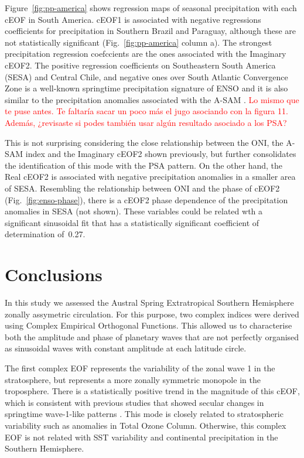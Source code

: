 \documentclass[smallextended]{svjour3}       %
\begin{document}
Figure~\ref{fig:pp-america} shows regression maps of seasonal precipitation with each cEOF in South America. cEOF1 is associated with negative regressions coefficients for precipitation in Southern Brazil and Paraguay, although these are not statistically significant (Fig.~\ref{fig:pp-america} column a). The strongest precipitation regression coefccients are the ones associated with the Imaginary cEOF2. The positive regression coefficients on Southeastern South America (SESA) and Central Chile, and negative ones over South Atlantic Convergence Zone is a well-known springtime precipitation signature of ENSO \citep{cai2020a} and it is also similar to the precipitation anomalies associated with the A-SAM \citep{campitelli2021}.
\textcolor{red}{Lo mismo que te puse antes. Te faltaría  sacar un poco más el jugo asociando con la figura 11. Además, ¿revisaste si podes también usar algún resultado asociado a los PSA? }

This is not surprising considering the close relationship between the ONI, the A-SAM index and the Imaginary cEOF2 shown previously, but further consolidates the identification of this mode with the PSA pattern.
On the other hand, the Real cEOF2 is associated with negative precipitation anomalies in a smaller area of SESA.
Resembling the relationship between ONI and the phase of cEOF2 (Fig.~\ref{fig:enso-phase}), there is a cEOF2 phase dependence of the precipitation anomalies in SESA (not shown).
These variables could be related wth a significant sinusoidal fit that has a statistically significant coefficient of determination of~0.27.



\hypertarget{conclusions}{%
\section{Conclusions}\label{conclusions}}

In this study we assessed the Austral Spring Extratropical Southern Hemisphere zonally assymetric circulation.
For this purpose, two complex indices were derived using Complex Empirical Orthogonal Functions.
This allowed us to characterise both the amplitude and phase of planetary waves that are not perfectly organised as sinusoidal waves with constant amplitude at each latitude circle.

The first complex EOF represents the variability of the zonal wave 1 in the stratosphere, but represents a more zonally symmetric monopole in the troposphere.
There is a statistically positive trend in the magnitude of this cEOF, which is consistent with previous studies that showed secular changes in springtime wave-1-like patterns \citep[e.g.][]{raphael2003}.
This mode is closely related to stratospheric variability such as anomalies in Total Ozone Column.
Otherwise, this complex EOF is not related with SST variability and continental precipitation in the Southern Hemisphere.
\end{document}

